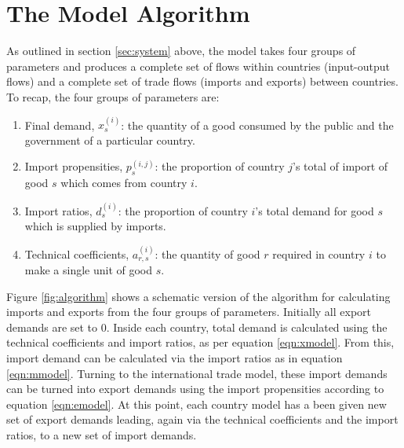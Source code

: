 \documentclass[a4paper]{article}
\begin{document}
\section{The Model Algorithm}\label{sec:algorithm}
As outlined in section \ref{sec:system} above, the model takes four groups of parameters and produces a complete set of flows within countries (input-output flows) and a complete set of trade flows (imports and exports) between countries.
To recap, the four groups of parameters are:
\begin{enumerate}
\item Final demand, $x_s^{(i)}$: the quantity of a good consumed by the public and the government of a particular country.
\item Import propensities, $p_s^{(i,j)}$: the proportion of country $j$'s total of import of good $s$ which comes from country $i$.
\item Import ratios, $d_s^{(i)}$: the proportion of country $i$'s total demand for good $s$ which is supplied by imports.
\item Technical coefficients, $a_{r,s}^{(i)}$: the quantity of good $r$ required in country $i$ to make a single unit of good $s$.
\end{enumerate}

Figure \ref{fig:algorithm} shows a schematic version of the algorithm for calculating imports and exports from the four groups of parameters.
Initially all export demands are set to 0.
Inside each country, total demand is calculated using the technical coefficients and import ratios, as per equation \eqref{eqn:xmodel}.
From this, import demand can be calculated via the import ratios as in equation \eqref{eqn:mmodel}.
Turning to the international trade model, these import demands can be turned into export demands using the import propensities according to equation \eqref{eqn:emodel}.
At this point, each country model has a been given new set of export demands leading, again via the technical coefficients and the import ratios, to a new set of import demands.
\end{document}

